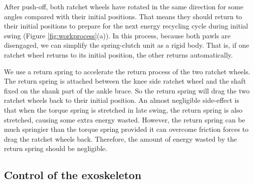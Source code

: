 \documentclass[twocolumn,cleanfoot,10pt]{asme2ej}
\begin{document}
After push-off, both ratchet wheels have rotated in the same direction for some angles compared with their initial positions.
That means they should return to their initial positions to prepare for the next energy recycling cycle during initial swing (Figure \ref{fig:workprocess}(a)).
In this process, because both pawls are disengaged, we can simplify the spring-clutch unit as a rigid body.
That is, if one ratchet wheel returns to its initial position, the other returns automatically.

We use a return spring to accelerate the return process of the two ratchet wheels.
The return spring is attached between the knee side ratchet wheel and the shaft fixed on the shank part of the ankle brace.
So the return spring will drag the two ratchet wheels back to their initial position.
An almost negligible side-effect is that when the torque spring is stretched in late swing, the return spring is also stretched, causing some extra energy wasted.
However, the return spring can be much springier than the torque spring provided it can overcome friction forces to drag the ratchet wheels back.
Therefore, the amount of energy wasted by the return spring should be negligible. 


\subsection{Control of the exoskeleton}
\end{document}
